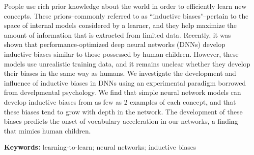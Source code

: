 People use rich prior knowledge about the world in order
to efficiently learn new concepts. These priors--commonly referred to as
``inductive biases"--pertain to the space of internal models considered by a
learner, and they help maximize the amount of information that is extracted
from limited data. Recently, it was shown that performance-optimized
deep neural networks (DNNs) develop inductive biases similar to those
possessed by human children. However, these models use unrealistic training
data, and it remains unclear whether they develop their biases in the same way
as humans. We investigate the development and influence of inductive biases
in DNNs using an experimental paradigm borrowed from develpmental psychology.
We find that simple neural network models can develop inductive
biases from as few as 2 examples of each concept, and that these biases tend
to grow with depth in the network. The development of these biases predicts
the onset of vocabulary acceleration in our networks, a finding that mimics
human children.

\textbf{Keywords:}
learning-to-learn; neural networks; inductive biases